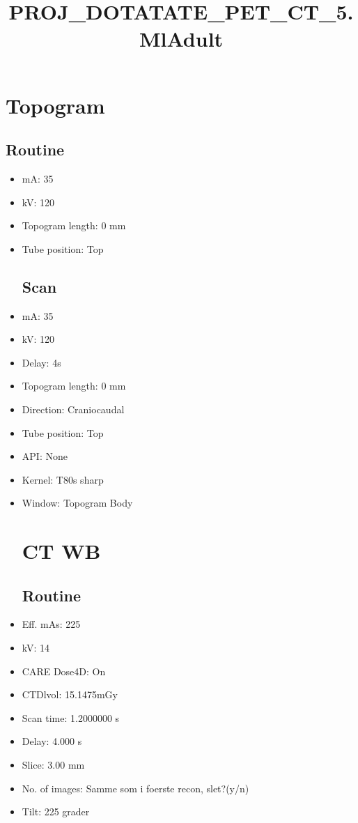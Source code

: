 \documentclass[12pt]{article}
\title{PROJ\_DOTATATE\_PET\_CT\_5.MlAdult}
\begin{document}
\maketitle
\newpage
\tableofcontents
\newpage
{}


\section{Topogram}
\subsection{Routine}
 \begin{itemize}\item mA: 35\item kV: 120\item Topogram length: 0 mm\item Tube position: Top
\subsection{Scan}
\item mA: 35\item kV: 120\item Delay: 4s\item Topogram length: 0 mm\item Direction: Craniocaudal\item Tube position: Top\item API: None\item Kernel: T80s sharp\item Window: Topogram Body
\section{CT WB}
\subsection{Routine}
\item Eff. mAs: 225\item kV: 14\item CARE Dose4D: On\item CTDlvol: 15.1475mGy\item Scan time: 1.2000000 s\item Delay: 4.000 s\item Slice: 3.00 mm\item No. of images: Samme som i foerste recon, slet?(y/n)\item Tilt: 225 grader

\end{itemize}
\end{document}
